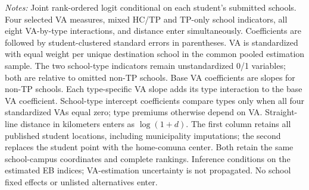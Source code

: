 \begin{table}[!htbp]
\begin{minipage}{0.98\linewidth}
\textit{Notes:} Joint rank-ordered logit conditional on each student's submitted schools. Four selected VA measures, mixed HC/TP and TP-only school indicators, all eight VA-by-type interactions, and distance enter simultaneously. Coefficients are followed by student-clustered standard errors in parentheses. VA is standardized with equal weight per unique destination school in the common pooled estimation sample. The two school-type indicators remain unstandardized 0/1 variables; both are relative to omitted non-TP schools. Base VA coefficients are slopes for non-TP schools. Each type-specific VA slope adds its type interaction to the base VA coefficient. School-type intercept coefficients compare types only when all four standardized VAs equal zero; type premiums otherwise depend on VA. Straight-line distance in kilometers enters as $\log(1+d)$. The first column retains all published student locations, including municipality imputations; the second replaces the student point with the home-comuna center. Both retain the same school-campus coordinates and complete rankings. Inference conditions on the estimated EB indices; VA-estimation uncertainty is not propagated. No school fixed effects or unlisted alternatives enter.
\end{minipage}
\end{table}
